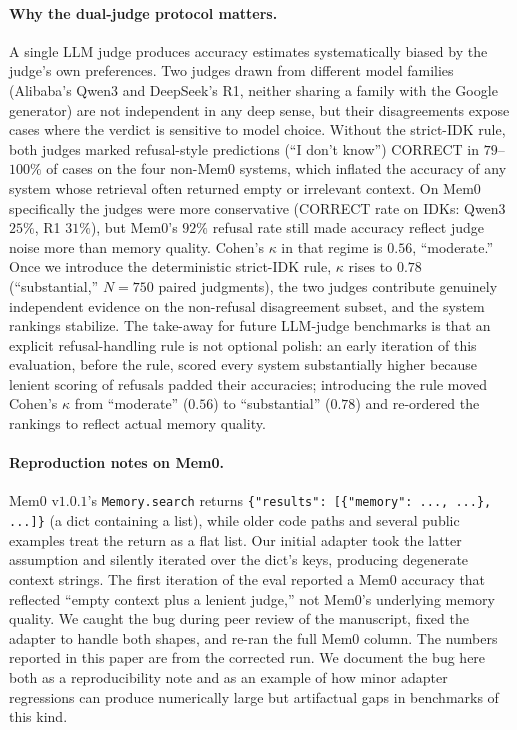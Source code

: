 \paragraph{Why the dual-judge protocol matters.} A single LLM judge produces accuracy estimates systematically biased by the judge's own preferences. Two judges drawn from different model families (Alibaba's Qwen3 and DeepSeek's R1, neither sharing a family with the Google generator) are not independent in any deep sense, but their disagreements expose cases where the verdict is sensitive to model choice. Without the strict-IDK rule, both judges marked refusal-style predictions (``I don't know'') CORRECT in $79$--$100\%$ of cases on the four non-Mem0 systems, which inflated the accuracy of any system whose retrieval often returned empty or irrelevant context. On Mem0 specifically the judges were more conservative (CORRECT rate on IDKs: Qwen3 $25\%$, R1 $31\%$), but Mem0's $92\%$ refusal rate still made accuracy reflect judge noise more than memory quality. Cohen's $\kappa$ in that regime is $0.56$, ``moderate.'' Once we introduce the deterministic strict-IDK rule, $\kappa$ rises to $0.78$ (``substantial,'' $N = 750$ paired judgments), the two judges contribute genuinely independent evidence on the non-refusal disagreement subset, and the system rankings stabilize. The take-away for future LLM-judge benchmarks is that an explicit refusal-handling rule is not optional polish: an early iteration of this evaluation, before the rule, scored every system substantially higher because lenient scoring of refusals padded their accuracies; introducing the rule moved Cohen's $\kappa$ from ``moderate'' ($0.56$) to ``substantial'' ($0.78$) and re-ordered the rankings to reflect actual memory quality.

\paragraph{Reproduction notes on Mem0.} Mem0 v$1.0.1$'s \texttt{Memory.search} returns \texttt{\{"results": [\{"memory": ..., ...\}, ...]\}} (a dict containing a list), while older code paths and several public examples treat the return as a flat list. Our initial adapter took the latter assumption and silently iterated over the dict's keys, producing degenerate context strings. The first iteration of the eval reported a Mem0 accuracy that reflected ``empty context plus a lenient judge,'' not Mem0's underlying memory quality. We caught the bug during peer review of the manuscript, fixed the adapter to handle both shapes, and re-ran the full Mem0 column. The numbers reported in this paper are from the corrected run. We document the bug here both as a reproducibility note and as an example of how minor adapter regressions can produce numerically large but artifactual gaps in benchmarks of this kind.

